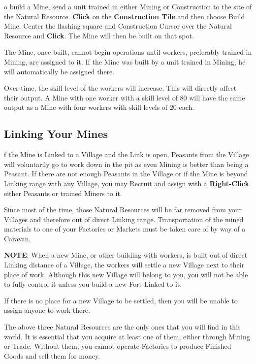 
o build a Mine, send a unit trained in either Mining or Construction to the site of the Natural Resource. \textbf{Click} on the \textbf{Construction Tile} and then choose Build Mine. Center the flashing square and Construction Cursor over the Natural Resource and \textbf{Click}. The Mine will then be built on that spot.

The Mine, once built, cannot begin operations until workers, preferably trained in Mining, are assigned to it. If the Mine was built by a unit trained in Mining, he will automatically be assigned there.

Over time, the skill level of the workers will increase. This will directly affect their output. A Mine with one worker with a skill level of 80 will have the same output as a Mine with four workers with skill levels of 20 each.

\subsection{\textsf{Linking Your Mines}}


f the Mine is Linked to a Village and the Link is open, Peasants from the Village will voluntarily go to work down in the pit as even Mining is better than being a Peasant. If there are not enough Peasants in the Village or if the Mine is beyond Linking range with any Village, you may Recruit and assign with a \textbf{Right-Click} either Peasants or trained Miners to it.

Since most of the time, those Natural Resources will be far removed from your Villages and therefore out of direct Linking range. Transportation of the mined materials to one of your Factories or Markets must be taken care of by way of a Caravan.

\textbf{NOTE}: When a new Mine, or other building with workers, is built out of direct Linking distance of a Village, the workers will settle a new Village next to their place of work. Although this new Village will belong to you, you will not be able to fully control it unless you build a new Fort Linked to it.

If there is no place for a new Village to be settled, then you will be unable to assign anyone to work there.


The above three Natural Resources are the only ones that you will find in this world. It is essential that you acquire at least one of them, either through Mining or Trade. Without them, you cannot operate Factories to produce Finished Goods and sell them for money.

